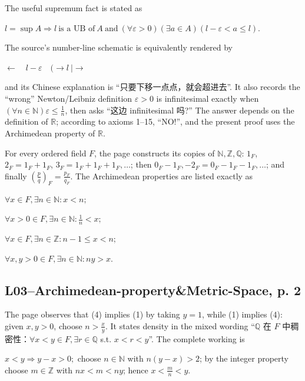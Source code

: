 The useful supremum fact is stated as

\(l = \sup A\Rightarrow l\ \text{is a UB of}\ A\ \text{and}\ \left( {\forall\varepsilon > 0} \right)\left( {\exists a \in A} \right)\left( {l - \varepsilon < a \leq l} \right).\)

The source's number-line schematic is equivalently rendered by

\(\longleftarrow\quad l - \varepsilon\quad\text{(}\longrightarrow l\ \text{|}\longrightarrow\)

and its Chinese explanation is ``只要下移一点点，就会超进去''. It also records the ``wrong'' Newton/Leibniz definition \(\varepsilon > 0\) is infinitesimal exactly when \(\left( {\forall n \in \mathbb{N}} \right)\varepsilon \leq \frac{1}{n}\), then asks ``这边 infinitesimal 吗?'' The answer depends on the definition of \(\mathbb{R}\); according to axioms 1--15, ``NO!'', and the present proof uses the Archimedean property of \(\mathbb{R}\).

For every ordered field \(F\), the page constructs its copies of \(\mathbb{N},\mathbb{Z},\mathbb{Q}\): \(1_{F}\), \(2_{F} = 1_{F} + 1_{F}\), \(3_{F} = 1_{F} + 1_{F} + 1_{F},\ldots\); then \(0_{F} - 1_{F}, - 2_{F} = 0_{F} - 1_{F} - 1_{F},\ldots\); and finally \(\left( \frac{p}{q} \right)_{F} = \frac{p_{F}}{q_{F}}\). The Archimedean properties are listed exactly as

\(\forall x \in F,\exists n \in \mathbb{N}:x < n;\)

\(\forall x > 0 \in F,\exists n \in \mathbb{N}:\frac{1}{n} < x;\)

\(\forall x \in F,\exists n \in \mathbb{Z}:n - 1 \leq x < n;\)

\(\forall x,y > 0 \in F,\exists n \in \mathbb{N}:ny > x.\)

\subsection{L03--Archimedean-property\&Metric-Space, p. 2}

The page observes that (4) implies (1) by taking \(y = 1\), while (1) implies (4): given \(x,y > 0\), choose \(n > \frac{x}{y}\). It states density in the mixed wording ``\(\mathbb{Q}\) 在 \(F\) 中稠密性：\(\forall x < y \in F,\exists r \in \mathbb{Q}\) s.t. \(x < r < y\)''. The complete working is

\(x < y\Rightarrow y - x > 0;\) choose \(n \in \mathbb{N}\) with \(n\left( {y - x} \right) > 2\); by the integer property choose \(m \in \mathbb{Z}\) with \(nx < m < ny\); hence \(x < \frac{m}{n} < y\).

